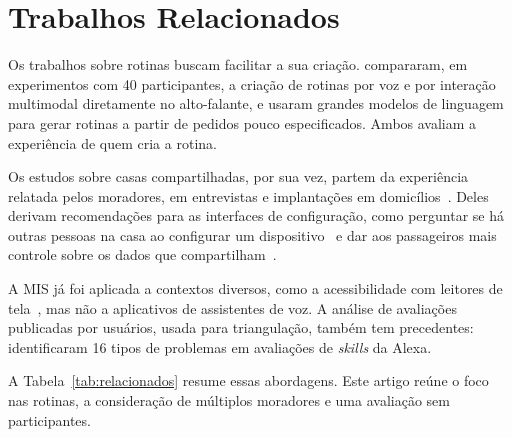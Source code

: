 \section{Trabalhos Relacionados}
\label{sec:relacionados}

Os trabalhos sobre rotinas buscam facilitar a sua criação.
\citet{barricelli2024routines} compararam, em experimentos com 40
participantes, a criação de rotinas por voz e por interação multimodal
diretamente no alto-falante, e \citet{king2024sasha} usaram grandes
modelos de linguagem para gerar rotinas a partir de pedidos pouco
especificados. Ambos avaliam a experiência de quem cria a rotina.

Os estudos sobre casas compartilhadas, por sua vez, partem da experiência
relatada pelos moradores, em entrevistas e implantações em
domicílios~\cite{geeng2019control,koshy2021passenger,zeng2019multiuser}.
Deles derivam recomendações para as interfaces de configuração, como
perguntar se há outras pessoas na casa ao configurar um
dispositivo~\cite{geeng2019control} e dar aos passageiros mais controle
sobre os dados que compartilham~\cite{koshy2021passenger}.

A MIS já foi aplicada a contextos diversos, como a acessibilidade com
leitores de tela~\cite{carvalho2023simsr}, mas não a aplicativos de
assistentes de voz. A análise de avaliações publicadas por usuários,
usada para triangulação, também tem precedentes:
\citet{atefi2020reviews} identificaram 16 tipos de problemas em
avaliações de \textit{skills} da Alexa.

A Tabela~\ref{tab:relacionados} resume essas abordagens. Este artigo
reúne o foco nas rotinas, a consideração de múltiplos moradores e uma
avaliação sem participantes.


